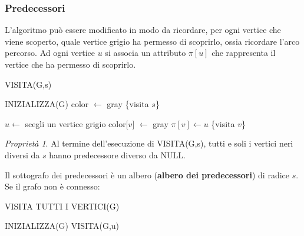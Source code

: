 \documentclass[11pt]{article}
\theoremstyle{remark}
\newtheorem*{remark}{Proprietà}
\begin{document}
\subsubsection{Predecessori}
L'algoritmo può essere modificato in modo da ricordare, per ogni vertice che viene scoperto, quale vertice grigio ha permesso 
di scoprirlo, ossia ricordare l'arco percorso. Ad ogni vertice $u$ si associa un attributo $\pi[u]$ che rappresenta il 
vertice che ha permesso di scoprirlo.
\begin{algorithm}[H]
    \caption{VISITA(G,s)}
    \begin{algorithmic}
        \State INIZIALIZZA(G)
        \State color $\gets$ gray
        \State \{visita $s$\}
    \end{algorithmic}
\end{algorithm}
\begin{algorithm}[H]
    \begin{algorithmic}
        \State $u \gets$ scegli un vertice grigio
                \State color[$v$] $\gets$ gray
                \State $\pi[v] \gets u$
                \State \{visita $v$\}
            \EndIf
        \EndWhile
    \end{algorithmic}
\end{algorithm}
\begin{remark}
    Al termine dell'esecuzione di VISITA(G,s), tutti e soli i vertici neri diversi da $s$ hanno predecessore diverso da 
    NULL.
\end{remark}
Il sottografo dei predecessori è un albero (\textbf{albero dei predecessori}) di radice $s$.\\
Se il grafo non è connesso:
\begin{algorithm}[H]
    \caption{VISITA TUTTI I VERTICI(G)}
    \begin{algorithmic}
        \State INIZIALIZZA(G)
            \State VISITA(G,u)
            \EndIf
        \EndFor
    \end{algorithmic}
\end{algorithm}
\end{document}
